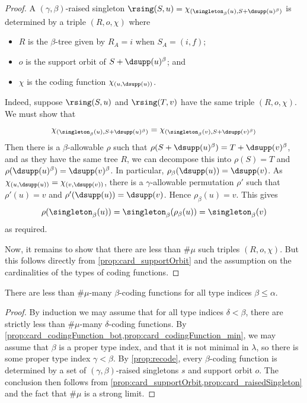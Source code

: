 \begin{proof}
  A \( (\gamma,\beta) \)-raised singleton \( \rsing(S,u) = \chi_{(\singleton_\beta(u), S + \dsupp(u)^\beta)} \) is determined by a triple \( (R, o, \chi) \) where
  \begin{itemize}
    \item \( R \) is the \( \beta \)-tree given by \( R_A = i \) when \( S_A = (i, f) \);
    \item \( o \) is the support orbit of \( S + \dsupp(u)^\beta \); and
    \item \( \chi \) is the coding function \( \chi_{(u, \dsupp(u))} \).
  \end{itemize}
  Indeed, suppose \( \rsing(S, u) \) and \( \rsing(T, v) \) have the same triple \( (R, o, \chi) \).
  We must show that
  \[ \chi_{(\singleton_\beta(u), S + \dsupp(u)^\beta)} = \chi_{(\singleton_\beta(v), S + \dsupp(v)^\beta)} \]
  Then there is a \( \beta \)-allowable \( \rho \) such that \( \rho(S + \dsupp(u)^\beta) = T + \dsupp(v)^\beta \), and as they have the same tree \( R \), we can decompose this into \( \rho(S) = T \) and \( \rho(\dsupp(u)^\beta) = \dsupp(v)^\beta \).
  In particular, \( \rho_\beta(\dsupp(u)) = \dsupp(v) \).
  As \( \chi_{(u, \dsupp(u))} = \chi_{(v, \dsupp(v))} \), there is a \( \gamma \)-allowable permutation \( \rho' \) such that \( \rho'(u) = v \) and \( \rho'(\dsupp(u)) = \dsupp(v) \).
  Hence \( \rho_\beta(u) = v \).
  This gives
  \[ \rho(\singleton_\beta(u)) = \singleton_\beta(\rho_\beta(u)) = \singleton_\beta(v) \]
  as required.

  Now, it remains to show that there are less than \( \#\mu \) such triples \( (R, o, \chi) \).
  But this follows directly from \cref{prop:card_supportOrbit} and the assumption on the cardinalities of the types of coding functions.
\end{proof}
\begin{proposition}
  \label{prop:card_codingFunction}
  There are less than \( \#\mu \)-many \( \beta \)-coding functions for all type indices \( \beta \leq \alpha \).
\end{proposition}
\begin{proof}
  By induction we may assume that for all type indices \( \delta < \beta \), there are strictly less than \( \#\mu \)-many \( \delta \)-coding functions.
  By \cref{prop:card_codingFunction_bot,prop:card_codingFunction_min}, we may assume that \( \beta \) is a proper type index, and that it is not minimal in \( \lambda \), so there is some proper type index \( \gamma < \beta \).
  By \cref{prop:recode}, every \( \beta \)-coding function is determined by a set of \( (\gamma,\beta) \)-raised singletons \( s \) and support orbit \( o \).
  The conclusion then follows from \cref{prop:card_supportOrbit,prop:card_raisedSingleton} and the fact that \( \#\mu \) is a strong limit.
\end{proof}
